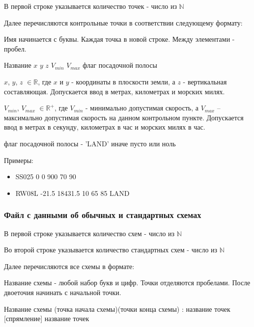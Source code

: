 \documentclass[12pt, a4 paper]{article}
\theoremstyle{plain}
\begin{document}
В первой строке указывается количество точек - число из $\mathbb{N}$

Далее перечисляются контрольные точки в соответствии следующему формату:

Имя начинается с буквы. Каждая точка в новой строке. Между элементами - пробел.

\bigskip

\begin{center}
Название $x$ $y$ $z$ $V_{min}$ $V_{max}$ флаг посадочной полосы
\end{center}

\bigskip

$x$, $y$, $z$ $\in \mathbb{R}$, где $x$ и $y$ - координаты в плоскости земли, а $z$ - вертикальная составляющая. Допускается ввод в метрах, километрах и морских милях.

$V_{min}$, $V_{max}$ $\in \mathbb{R}^+$, где $V_{min}$ - минимально допустимая скорость, а $V_{max}$ -- максимально допустимая скорость на данном контрольном пункте. Допускается ввод в метрах в секунду, километрах в час и морских милях в час.

флаг посадочной полосы -  'LAND' иначе пусто или ноль

Примеры:

\begin{itemize}
	\item  SS025 0 0 900 70 90
	\item  RW08L -21.5 18431.5 10 65 85 LAND
\end{itemize}


\subsubsection{Файл с данными об обычных и стандартных схемах}


В первой строке указывается количество схем - число из $\mathbb{N}$

Во второй строке указывается количество стандартных схем  - число из $\mathbb{N}$

Далее перечисляются все схемы в формате:

Название схемы - любой набор букв и цифр. Точки отделяются пробелами. После двоеточия начинать с начальной точки.

\bigskip

\begin{center}
Название схемы (точка начала схемы)(точки конца схемы) : название точек [спрямление] название точек
\end{center}
\end{document}

